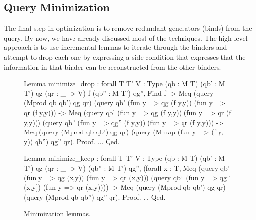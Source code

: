 \documentclass{sigplanconf}
\newcommand{\ltac}[0]{\ensuremath{\mathcal{L}_{\mathrm{tac}}}}
\begin{document}


\subsection{Query Minimization}
\label{sec:minimization}

The final step in optimization is to remove redundant generators (binds) from the query.
By now, we have already discussed most of the techniques.
The high-level approach is to use incremental lemmas to iterate through the binders and attempt to drop each one by expressing a side-condition that expresses that the information in that binder can be reconstructed from the other binders.

\begin{figure}
\begin{coq}
Lemma minimize_drop
: forall {T T' V : Type} (qb : M T) (qb' : M T') qg (qr : _ -> V) f (qb'' : M T') qg'',
   Find f
-> Meq (query (Mprod qb qb') qg qr)
       (query qb' (fun y => qg (f y,y)) (fun y => qr (f y,y)))
-> Meq (query qb' (fun y => qg (f y,y)) (fun y => qr (f y,y)))
       (query qb'' (fun y => qg'' (f y,y)) (fun y => qr (f y,y)))
-> Meq (query (Mprod qb qb') qg qr)
       (query (Mmap (fun y => (f y, y)) qb'') qg'' qr).
Proof. ... Qed.

Lemma minimize_keep
: forall {T T' V : Type} (qb : M T) (qb' : M T') qg (qr : _ -> V) (qb'' : M T') qg'',
  (forall x : T,
   Meq (query qb' (fun y => qg (x,y)) (fun y => qr (x,y)))
       (query qb'' (fun y => qg'' (x,y)) (fun y => qr (x,y)))) ->
  Meq (query (Mprod qb qb') qg qr)
      (query (Mprod qb qb'') qg'' qr).
Proof. ... Qed.
\end{coq}
\caption{Minimization lemmas.}
\label{fig:minimize-lemmas}
\end{figure}
\end{document}
